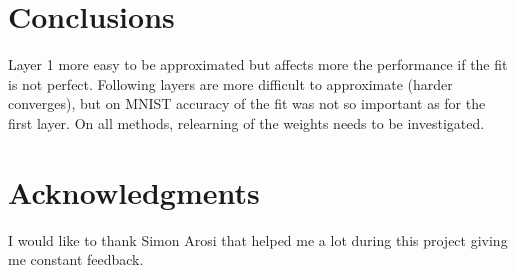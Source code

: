 \documentclass{article} %
\begin{document}
\section{Conclusions}
Layer 1 more easy to be approximated but affects more the performance if the fit is not perfect.
Following layers are more difficult to approximate (harder converges), but on MNIST accuracy of the fit was not so important as for the first layer.
On all methods, relearning of the weights needs to be investigated.

\section*{Acknowledgments}
I would like to thank Simon Arosi that helped me a lot during this project giving me constant feedback.



\end{document}

